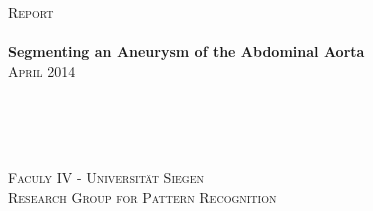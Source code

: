 \begin{titlepage}

\begin{center}

\Large{\textsc{Report}}\\[0.4cm]

\HRule \\[0.5cm]

\Huge{\bfseries{Segmenting an Aneurysm of the Abdominal Aorta}}\\[0.5cm]

\Large{\textsc{April 2014}}\\[0.4cm]

\HRule \\[0.5cm]

\vfill

\\[0.5cm]  
\\[0.3cm]                                  

\vfill

\end{center}

\vfill
\begin{center}
    \small{\textsc{Faculy IV - Universität Siegen}}\\[0.4cm]
    \small{\textsc{Research Group for Pattern Recognition}}\\[0.4cm]                
\end{center}

\end{titlepage}
